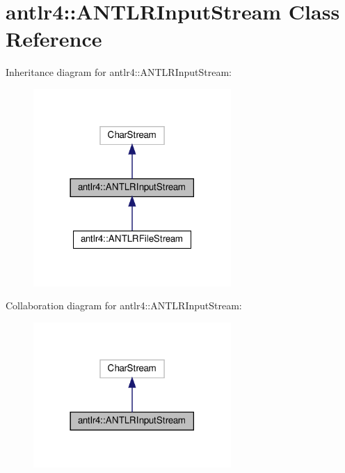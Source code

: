 \hypertarget{classantlr4_1_1ANTLRInputStream}{}\section{antlr4\+:\+:A\+N\+T\+L\+R\+Input\+Stream Class Reference}
\label{classantlr4_1_1ANTLRInputStream}


Inheritance diagram for antlr4\+:\+:A\+N\+T\+L\+R\+Input\+Stream\+:
\nopagebreak
\begin{figure}[H]
\begin{center}
\leavevmode
\includegraphics[width=213pt]{classantlr4_1_1ANTLRInputStream__inherit__graph}
\end{center}
\end{figure}


Collaboration diagram for antlr4\+:\+:A\+N\+T\+L\+R\+Input\+Stream\+:
\nopagebreak
\begin{figure}[H]
\begin{center}
\leavevmode
\includegraphics[width=213pt]{classantlr4_1_1ANTLRInputStream__coll__graph}
\end{center}
\end{figure}
